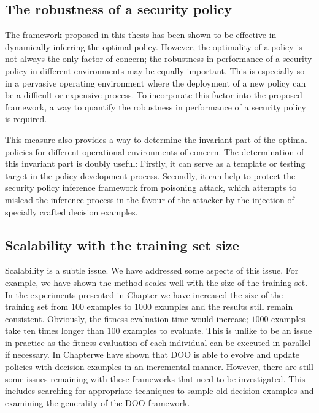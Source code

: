 \subsection{The robustness of a security policy}
The framework proposed in this thesis has been shown to be effective
in dynamically inferring the optimal policy. However, the optimality
of a policy is not always the only factor of concern; the robustness
in performance of a security policy in different environments may be
equally important. This is especially so in a pervasive operating
environment where the deployment of a new policy can be a difficult or
expensive process. To incorporate this factor into the proposed
framework, a way to quantify the robustness in performance of a
security policy is required.

This measure also provides a way to determine the invariant part of
the optimal policies for different operational environments of
concern. The determination of this invariant part is doubly useful:
Firstly, it can serve as a template or testing target in the policy
development process. Secondly, it can help to protect the security
policy inference framework from poisoning attack, which attempts to
mislead the inference process in the favour of the attacker by the
injection of specially crafted decision examples.

\subsection{Scalability with the training set size}
Scalability is a subtle issue. We have addressed some aspects of this
issue. For example, we have shown the method scales well with the size
of the training set. In the experiments presented in
Chapter  we have increased the
size of the training set from $100$ examples to $1000$ examples and
the results still remain consistent. Obviously, the fitness evaluation
time would increase; $1000$ examples take ten times longer than $100$
examples to evaluate. This is unlike to be an issue in practice as the
fitness evaluation of each individual can be executed in parallel if
necessary. In Chapterwe have
shown that DOO is able to evolve and update policies with decision
examples in an incremental manner. However, there are still some
issues remaining with these frameworks that need to be
investigated. This includes searching for appropriate techniques to
sample old decision examples and examining the generality of the DOO
framework.


